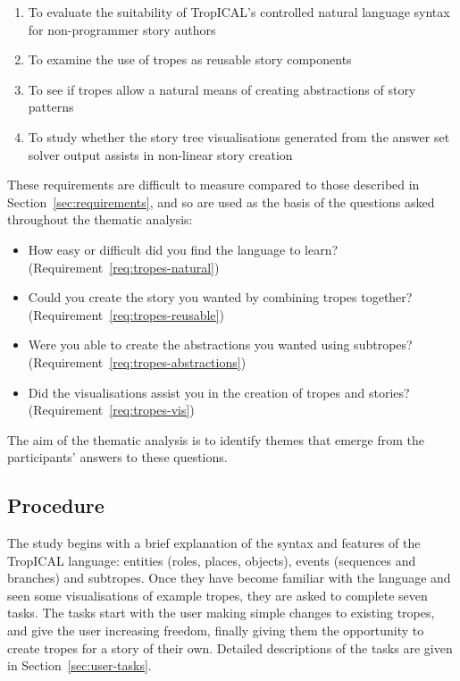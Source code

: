 \documentclass[11pt]{report}
\begin{document}
\begin{enumerate}[S1.]
  \item\label{req:tropes-natural} To evaluate the suitability of TropICAL's controlled natural language
    syntax for non-programmer story authors
  \item\label{req:tropes-reusable} To examine the use of tropes as reusable story components
  \item\label{req:tropes-abstractions} To see if tropes allow a natural means of creating abstractions of story patterns
  \item\label{req:tropes-vis} To study whether the story tree visualisations
    generated from the answer set solver output assists in non-linear story creation
\end{enumerate}

These requirements are difficult to measure compared to those described in
Section~\ref{sec:requirements}, and so are used as the basis of the questions
asked throughout the thematic analysis:

\begin{itemize}
  \item How easy or difficult did you find the language to learn? (Requirement~\ref{req:tropes-natural})
  \item Could you create the story you wanted by combining tropes together? (Requirement~\ref{req:tropes-reusable})
  \item Were you able to create the abstractions you wanted using subtropes? (Requirement~\ref{req:tropes-abstractions})
  \item Did the visualisations assist you in the creation of tropes and stories? (Requirement~\ref{req:tropes-vis})
\end{itemize}

The aim of the thematic analysis is to identify themes that emerge from the participants' answers to these questions.

\subsection{Procedure}

The study begins with a brief explanation of the syntax and features of the
TropICAL language: entities (roles, places, objects), events (sequences and
branches) and subtropes. Once they have become familiar with the language and
seen some visualisations of example tropes, they are asked to complete seven
tasks. The tasks start with the user making simple changes to existing tropes,
and give the user increasing freedom, finally giving them the opportunity to
create tropes for a story of their own. Detailed descriptions of the tasks are
given in Section~\ref{sec:user-tasks}.
\end{document}
